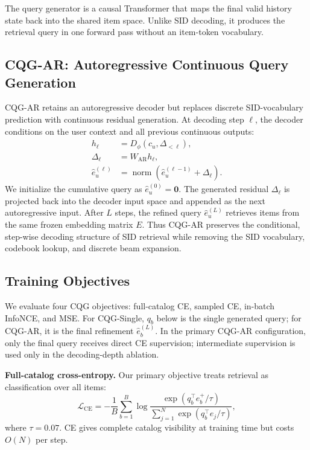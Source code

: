 \documentclass[letterpaper]{article}
\begin{document}
The query generator is a causal Transformer that maps the final valid history
state back into the shared item space. Unlike SID decoding, it produces the
retrieval query in one forward pass without an item-token vocabulary.

\subsection{CQG-AR: Autoregressive Continuous Query Generation}

CQG-AR retains an autoregressive decoder but replaces discrete SID-vocabulary prediction with continuous residual generation. At decoding step $\ell$, the decoder conditions on the user context and all previous continuous outputs:
\begin{align}
h_\ell &= D_\phi(c_u,\Delta_{<\ell}),\\
\Delta_\ell &= W_{\mathrm{AR}}h_\ell,\\
\hat e_u^{(\ell)} &=
\operatorname{norm}\!\left(\hat e_u^{(\ell-1)}+\Delta_\ell\right).
\end{align}
We initialize the cumulative query as
\(\hat e_u^{(0)}=\mathbf{0}\).
The generated residual $\Delta_\ell$ is projected back into the decoder input space and appended as the next autoregressive input. After $L$ steps, the refined query $\hat e_u^{(L)}$ retrieves items from the same frozen embedding matrix $E$. Thus CQG-AR preserves the conditional, step-wise decoding structure of SID retrieval while removing the SID vocabulary, codebook lookup, and discrete beam expansion.

\subsection{Training Objectives}

We evaluate four CQG objectives: full-catalog CE, sampled CE, in-batch
InfoNCE, and MSE. For CQG-Single, $q_b$ below is the single generated query;
for CQG-AR, it is the final refinement $\hat e_b^{(L)}$. In the primary
CQG-AR configuration, only the final query receives direct CE supervision;
intermediate supervision is used only in the decoding-depth ablation.

\textbf{Full-catalog cross-entropy.}
Our primary objective treats retrieval as classification over all items:
\begin{equation}
\mathcal{L}_{\mathrm{CE}}
= -\frac{1}{B}\sum_{b=1}^{B}
\log
\frac{\exp(q_b^\top e_b^+/\tau)}
{\sum_{j=1}^{N}\exp(q_b^\top e_j/\tau)} ,
\end{equation}
where $\tau=0.07$. CE gives complete catalog visibility at training time but costs $O(N)$ per step.
\end{document}

